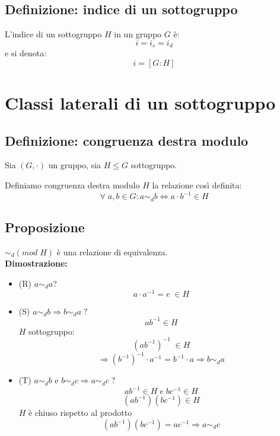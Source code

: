 \subsection{Definizione: indice di un sottogruppo}
L'indice di un sottogruppo \(H\) in un gruppo \(G\) è:
\[i=i_s=i_d\]
e si denota:
\[i=[G:H]\]

\section{Classi laterali di un sottogruppo}
\subsection{Definizione: congruenza destra modulo}
Sia \((G,\cdot)\) un gruppo, sia \(H\leq G\) sottogruppo.

Definiamo congruenza destra modulo \(H\) la relazione così definita:
\[\forall\; a,b\in G: a\sim _d b\Leftrightarrow a\cdot b^{-1}\in H\]

\subsection{Proposizione}
\(\sim _d(mod\;H)\) è una relazione di equivalenza.
\\\textbf{Dimostrazione:}
\begin{itemize}

	\item (R) \(a\sim _d a\)?
	\[a\cdot a^{-1}=e\;\in H\]

	\item (S) \(a\sim _d b\Rightarrow b\sim _d a\;?\)
	\[ab^{-1}\in H\]
	\(H\) sottogruppo:
	\[(ab^{-1})^{-1}\;\in H\]
	\[\Rightarrow (b^{-1})^{-1}\cdot a^{-1}=b^{-1}\cdot a\Rightarrow b\sim _d a\]

	\item (T) \(a\sim _d b\) e \(b\sim _d c\Rightarrow a\sim _d c\;?\)
	\[ab^{-1}\in H\;e\;bc^{-1}\in H\] 
	\[(ab^{-1})(bc^{-1})\in H\]
	\(H\) è chiuso rispetto al prodotto
	\[(ab^{-1})(bc^{-1})=ac^{-1}\Rightarrow a\sim _d c\]

\end{itemize}

